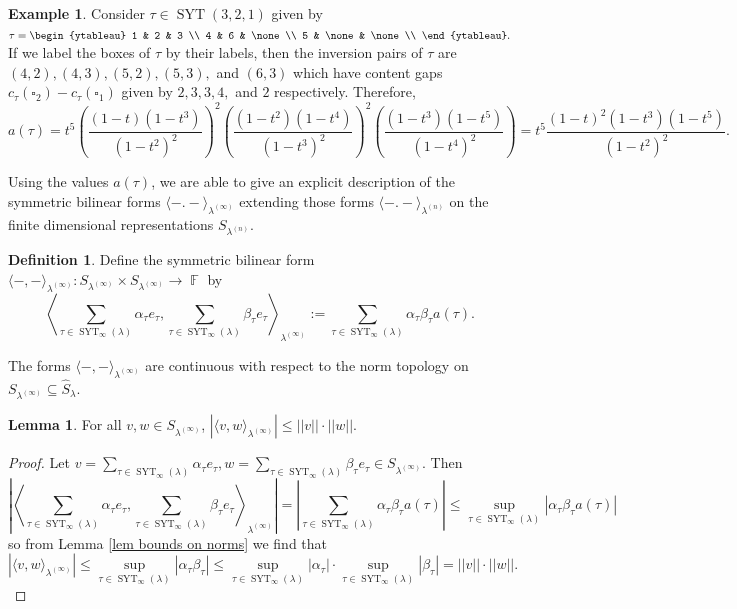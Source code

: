 \documentclass[12pt,reqno]{amsart}
\theoremstyle{definition}
\newtheorem{lem}[thm]{Lemma}
\newtheorem{defn}[thm]{Definition}
\newtheorem{example}{Example}
\DeclareMathOperator{\bF}{\mathbb{F}}
\DeclareMathOperator{\SYT}{\mathrm{SYT}}
\begin{document}
\begin{example}
   Consider $\tau \in \SYT(3,2,1)$ given by $\tau = \begin{ytableau}
       1 & 2 & 3 \\
       4 & 6 & \none\\
       5 & \none & \none \\
   \end{ytableau}.$ If we label the boxes of $\tau$ by their labels, then the inversion pairs of $\tau$ are $(4,2),(4,3),(5,2),(5,3),$ and $(6,3)$ which have content gaps $c_{\tau}(\square_2)-c_{\tau}(\square_1)$ given by $2,3,3,4,$ and $2$ respectively. 
   Therefore, 
   $$a(\tau) = t^{5} \left( \frac{(1-t)(1-t^3)}{(1-t^2)^2} \right)^2 \left( \frac{(1-t^2)(1-t^4)}{(1-t^3)^2} \right)^2 \left( \frac{(1-t^3)(1-t^5)}{(1-t^4)^2} \right) = t^5 \frac{(1-t)^2(1-t^3)(1-t^5)}{(1-t^2)^2}.$$
\end{example}

Using the values $a(\tau)$, we are able to give an explicit description of the symmetric bilinear forms $\langle-.-\rangle_{\lambda^{(\infty)}}$ extending those forms $\langle-.-\rangle_{\lambda^{(n)}}$ on the finite dimensional representations $S_{\lambda^{(n)}}.$

\begin{defn}
    Define the symmetric bilinear form $\langle - , - \rangle_{\lambda^{(\infty)}}: S_{\lambda^{(\infty)}} \times S_{\lambda^{(\infty)}} \rightarrow \bF$ by 
    $$\left\langle \sum_{\tau \in \SYT_{\infty}(\lambda)} \alpha_{\tau} e_{\tau},  \sum_{\tau \in \SYT_{\infty}(\lambda)} \beta_{\tau} e_{\tau}\right\rangle_{\lambda^{(\infty)}}:= \sum_{\tau \in \SYT_{\infty}(\lambda)} \alpha_{\tau} \beta_{\tau} a(\tau).$$
\end{defn}

The forms $\langle-,-\rangle_{\lambda^{(\infty)}}$ are continuous with respect to the norm topology on $S_{\lambda^{(\infty)}} \subseteq \hat{S}_{\lambda}.$

\begin{lem}\label{lem inner product is continuous}
    For all $v,w \in S_{\lambda^{(\infty)}}$, $|\langle v,w \rangle_{\lambda^{(\infty)}}| \leq ||v||\cdot ||w|| .$
\end{lem}
\begin{proof}
    Let $v = \sum_{\tau \in \SYT_{\infty}(\lambda)} \alpha_{\tau} e_{\tau}, w = \sum_{\tau \in \SYT_{\infty}(\lambda)} \beta_{\tau} e_{\tau} \in S_{\lambda^{(\infty)}}.$ Then
    $$\left|\left\langle \sum_{\tau \in \SYT_{\infty}(\lambda)} \alpha_{\tau} e_{\tau},  \sum_{\tau \in \SYT_{\infty}(\lambda)} \beta_{\tau} e_{\tau}\right\rangle_{\lambda^{(\infty)}} \right|= \left|\sum_{\tau \in \SYT_{\infty}(\lambda)} \alpha_{\tau} \beta_{\tau} a(\tau)\right| \leq \sup_{\tau \in \SYT_{\infty}(\lambda)} | \alpha_{\tau} \beta_{\tau} a(\tau)|$$ so from Lemma \ref{lem bounds on norms} we find that 
    $$|\langle v, w \rangle_{\lambda^{(\infty)}}| \leq \sup_{\tau \in \SYT_{\infty}(\lambda)} | \alpha_{\tau} \beta_{\tau}| \leq \sup_{\tau \in \SYT_{\infty}(\lambda)} | \alpha_{\tau}| \cdot \sup_{\tau \in \SYT_{\infty}(\lambda)} |  \beta_{\tau}| = ||v|| \cdot ||w||.$$
\end{proof}
\end{document}
